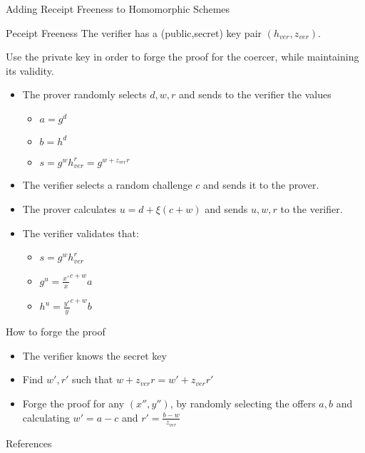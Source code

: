 \documentclass{beamer}
\begin{document}
\begin{frame}[allowframebreaks]{Adding Receipt Freeness to Homomorphic Schemes \cite{HS00}}
\begin{block}{Ρeceipt Freeness}
The verifier has a (public,secret) key pair $(h_{ver},z_{ver})$. 

Use the private key in order to forge the proof for the coercer, while maintaining its validity. 
\end{block}



\begin{itemize}
\item The prover randomly selects $d,w,r$ and sends to the verifier the values 
\begin{itemize}
\item 	$a=g^d$
\item  	$b=h^d$
\item 	$s=g^w h_{ver}^r=g^{w+z_{ver}r}$
\end{itemize}  
\item The verifier selects a random challenge $c$ and sends it to the prover.
\item The prover calculates $u=d+\xi(c+w)$ and sends $u,w,r$ to the verifier.
\item The verifier validates that: 
\begin{itemize}
\item $s=g^w h_{ver}^r$
\item $g^u = \frac{x'}{x}^{c+w} a$
\item $h^u = \frac{y'}{y}^{c+w} b$
\end{itemize}
\end{itemize}

\begin{block}{How to forge the proof}
\begin{itemize}
\item The verifier knows the secret key 
\item Find $w',r'$ such that $w+z_{ver}r=w'+z_{ver}r'$ 
\item Forge the proof for any $(x'',y'')$, by randomly selecting the offers $a,b$ and calculating $w'=a-c$ and $r'=\frac{b-w}{z_{ver}}$
\end{itemize}
\end{block}
\end{frame}

\begin{frame}[allowframebreaks]{References}
\begin{small}
\nocite{*}


\end{small}
\end{frame}
 
\end{document}
